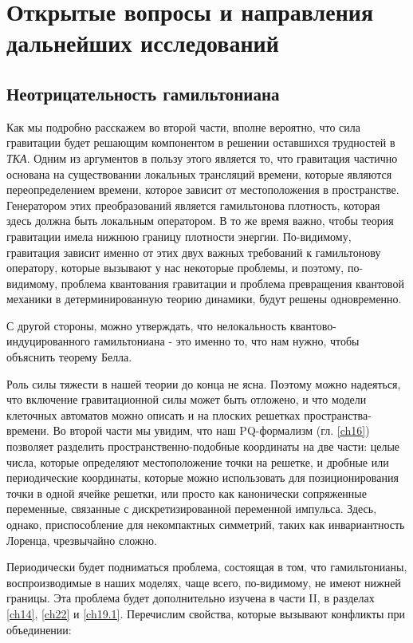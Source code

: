 \documentclass[main.tex]{subfiles}
\begin{document}
\section{Открытые вопросы и направления дальнейших исследований}\label{ch9}

\subsection{Неотрицательность гамильтониана}\label{ch9.1}

Как мы подробно расскажем во второй части, вполне вероятно, что сила гравитации будет решающим компонентом в решении оставшихся трудностей в \textit{ТКА}. Одним из аргументов в пользу этого является то, что гравитация частично основана на существовании локальных трансляций времени, которые являются переопределением времени, которое зависит от местоположения в пространстве. Генератором этих преобразований является гамильтонова плотность, которая здесь должна быть локальным оператором. В то же время важно, чтобы теория гравитации имела нижнюю границу плотности энергии. По-видимому, гравитация зависит именно от этих двух важных требований к гамильтонову оператору, которые вызывают у нас некоторые проблемы, и поэтому, по-видимому, проблема квантования гравитации и проблема превращения квантовой механики в детерминированную теорию динамики, будут решены одновременно.

С другой стороны, можно утверждать, что нелокальность квантово-индуцированного гамильтониана - это именно то, что нам нужно, чтобы объяснить теорему Белла.

Роль силы тяжести в нашей теории до конца не ясна. Поэтому можно надеяться, что включение гравитационной силы может быть отложено, и что модели клеточных автоматов можно описать и на плоских решетках пространства-времени. Во второй части мы увидим, что наш PQ-формализм (гл. \ref{ch16}) позволяет разделить пространственно-подобные координаты на две части: целые числа, которые определяют местоположение точки на решетке, и дробные или периодические координаты, которые можно использовать для позиционирования точки в одной ячейке решетки, или просто как канонически сопряженные переменные, связанные с дискретизированной переменной импульса. Здесь, однако, приспособление для некомпактных симметрий, таких как инвариантность Лоренца, чрезвычайно сложно.

Периодически будет подниматься проблема, состоящая в том, что гамильтонианы, воспроизводимые в наших моделях, чаще всего, по-видимому, не имеют нижней границы. Эта проблема будет дополнительно изучена в части II, в разделах \ref{ch14}, \ref{ch22} и  \ref{ch19.1}. Перечислим свойства, которые вызывают конфликты при объединении:
\end{document}
